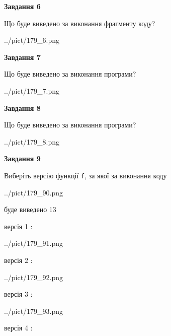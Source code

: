 \documentclass[12pt, ukrainian]{article}
\def\code#1{\Verb!#1!}
\begin{document}
{\begin {large}
{\begin {center}\textbf{Завдання 6}\end {center}}

Що буде виведено за виконання фрагменту коду?\par
\begin{center}
	{../pict/179_6.png}
\end{center}
\newpage

{\begin {center}\textbf{Завдання 7}\end {center}}

Що буде виведено за виконання програми?\par
\begin{center}
	{../pict/179_7.png}
\end{center}
\newpage

{\begin {center}\textbf{Завдання 8}\end {center}}

Що буде виведено за виконання програми?\par
\begin{center}
	{../pict/179_8.png}
\end{center}
\newpage

{\begin {center}\textbf{Завдання 9}\end {center}}

Виберіть версію функції \code{f}, за якої за виконання коду
\begin{center}
	{../pict/179_90.png}
\end{center}
буде виведено 13

\vspace{5mm}
версія 1 :

\begin{center}
	{../pict/179_91.png}
\end{center}
версія 2 :

\begin{center}
	{../pict/179_92.png}
\end{center}
версія 3 :

\begin{center}
	{../pict/179_93.png}
\end{center}
версія 4 :


\end{large}}
\end{document}
